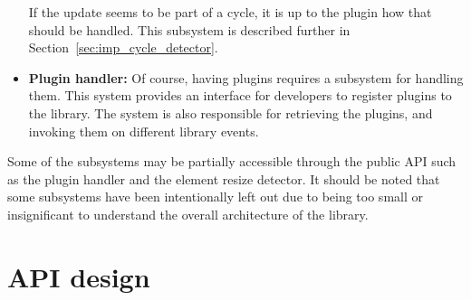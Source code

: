 \documentclass[a4paper,11pt]{kth-mag}
\begin{document}
\begin{itemize}
          If the update seems to be part of a cycle, it is up to the plugin how that should be handled.
          This subsystem is described further in Section~\ref{sec:imp_cycle_detector}.
        \item \textbf{Plugin handler:}
          Of course, having plugins requires a subsystem for handling them.
          This system provides an interface for developers to register plugins to the library.
          The system is also responsible for retrieving the plugins, and invoking them on different library events.
      \end{itemize}
      Some of the subsystems may be partially accessible through the public \gls{API} such as the plugin handler and the \gls{element} resize detector.
      It should be noted that some subsystems have been intentionally left out due to being too small or insignificant to understand the overall architecture of the library.

   
    \section{API design}\label{sec:elq-api}
\end{document}
